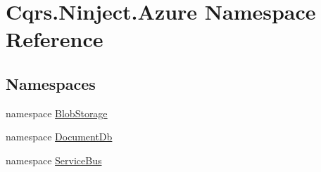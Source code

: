 \hypertarget{namespaceCqrs_1_1Ninject_1_1Azure}{}\section{Cqrs.\+Ninject.\+Azure Namespace Reference}
\label{namespaceCqrs_1_1Ninject_1_1Azure}
\subsection*{Namespaces}
\begin{DoxyCompactItemize}
\item 
namespace \hyperlink{namespaceCqrs_1_1Ninject_1_1Azure_1_1BlobStorage}{Blob\+Storage}
\item 
namespace \hyperlink{namespaceCqrs_1_1Ninject_1_1Azure_1_1DocumentDb}{Document\+Db}
\item 
namespace \hyperlink{namespaceCqrs_1_1Ninject_1_1Azure_1_1ServiceBus}{Service\+Bus}
\end{DoxyCompactItemize}

